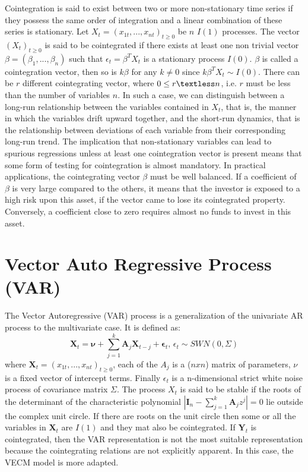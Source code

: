 \documentclass[11pt,a4,twosided,singlespacing,titlepagenumber=on]{scrreprt}
\numberwithin{equation}{chapter} %
\theoremstyle{remark}
\newcommand{\matr}[1]{\mathbf{#1}}
\begin{document}
Cointegration is said to exist between two or more non-stationary time series if they possess the same order of integration and a linear combination of these series is stationary. Let $X_t = (x_{1t},...,x_{nt})_{t \geq 0}$ be $n$ $I(1)$ processes. The vector $(X_t)_{t \geq 0}$ is said to be cointegrated if there exists at least one non trivial vector $\beta = (\beta_1,...,\beta_n)$ such that $\epsilon_t = \beta^T X_t$ is a stationary process $I(0)$. $\beta$ is called a cointegration vector, then so is $k \beta$ for any $k \neq 0$ since $k\beta^TX_t \sim I(0)$. There can be $r$ different cointegrating vector, where $0 \leq r \textless n$, i.e. $r$ must be less than the number of variables $n$. In such a case, we can distinguish between a long-run relationship between the variables contained in $X_t$, that is, the manner in which the variables drift upward together, and the short-run dynamics, that is the relationship between deviations of each variable from their corresponding long-run trend. The implication that non-stationary variables can lead to spurious regressions unless at least one cointegration vector is present means that some form of testing for cointegration is almost mandatory. In practical applications, the cointegrating vector $\beta$ must be well balanced. If a coefficient of $\beta$ is very large compared to the others, it means that the investor is exposed to a high risk upon this asset, if the vector came to lose its cointegrated property. Conversely, a coefficient close to zero requires almost no funds to invest in this asset.

\section{Vector Auto Regressive Process (VAR)}
The Vector Autoregressive (VAR) process is a generalization of the univariate AR process to the multivariate case. It is defined as:
\begin{equation}
\matr{X}_t = \matr{\nu} + \sum_{j=1}^k \matr{A}_j \matr{X}_{t-j} + \matr{\epsilon}_t \text{, } \epsilon_t \sim SWN(0, \Sigma)
\end{equation}
where $\matr{X}_t = (x_{1t},...,x_{nt})_{t \geq 0}$, each of the $A_j$ is a ($nxn$) matrix of parameters, $\nu$ is a fixed vector of intercept terms. Finally $\epsilon_t$ is a n-dimensional strict white noise process of covariance matrix $\Sigma$. The process $X_t$ is said to be stable if the roots of the determinant of the characteristic polynomial $|\matr{I}_n - \sum_{j=1}^k \matr{A}_j z^j| = 0$ lie outside the complex unit circle. If there are roots on the unit circle then some or all the variables in $\matr{X}_t$ are $I(1)$ and they mat also be cointegrated. If $\matr{Y}_t$ is cointegrated, then the VAR representation is not the most suitable representation because the cointegrating relations are not explicitly apparent. In this case, the VECM model is more adapted.
\end{document}

